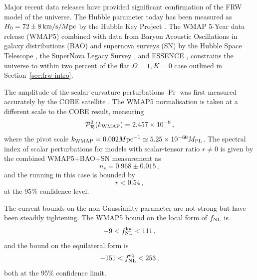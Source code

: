 Major recent data releases have provided significant confirmation of the FRW
model of the universe. The Hubble parameter today has been measured as $H_0 =
72\pm8\,\mathrm{km}/\mathrm{s}/M \mathrm{pc}$ by the Hubble Key Project
\cite{Freedman2001}. The WMAP 5-Year data release (WMAP5) combined with
data from Baryon
Acoustic Oscillations in galaxy distributions (BAO) \cite{Percival2007}
and supernova surveys (SN) by the Hubble Space Telescope \cite{Riess2004,
Riess2007}, the SuperNova Legacy Survey \cite{Astier2006}, and ESSENCE
\cite{Wood-Vasey2007},  constrains the
universe to within two percent of the flat $\Omega =1, K=0$ case outlined in
Section~\ref{sec:frw-intro}. 

The amplitude of the scalar curvature perturbations $\Pr$ was first measured
accurately by the COBE satellite \cite{Bennett1994, Bennett1996c}. The WMAP5
normalisation is taken at a different scale to the COBE result, measuring
% 
\begin{equation}
 \label{eq:wmapnorm-intro}
 \mathcal{P}_{\mathcal{R}}^2 (k_\mathrm{WMAP}) = 2.457 \times 10^{-9}\,,
\end{equation}
% 
where the pivot scale $k_\mathrm{WMAP} = 0.002M \mathrm{pc}^{-1} \simeq 5.25\times 10^{-60}M_{\mathrm{PL}}$. The
spectral index of scalar perturbations for models with scalar-tensor ratio
$r\ne0$ is given by the combined WMAP5+BAO+SN measurement as
% 
\begin{equation}
 \label{eq:wmapns-intro}
 n_s = 0.968 \pm 0.015\,,
\end{equation}
% 
and the running in this case is bounded by
% 
\begin{equation}
\label{eq:rbound-intro}
 r < 0.54\,,
\end{equation}
at the 95\% confidence level.

The current bounds on the non-Gaussianity parameter are not strong but have
been steadily tightening. The WMAP5 bound on the local form of $f_{\mathrm{NL}}$ is
% 
\begin{equation}
 -9<f_{\mathrm{NL}}^\mathrm{loc}<111\,,
\end{equation}
% 
and the bound on the equilateral form is
% 
\begin{equation}
 -151<f_{\mathrm{NL}}^{\mathrm{eq}}<253\,,
\end{equation}
% 
both at the 95\% confidence limit. 



